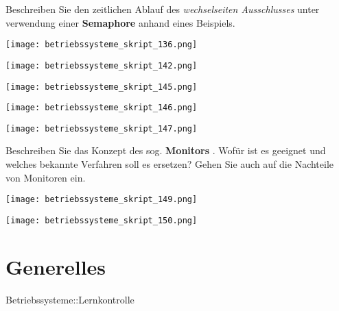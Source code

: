 \documentclass{article}
\begin{document}
\begin{tcolorbox}[colback=white!10!white,colframe=lightgray!75!black,
  savelowerto=\jobname_ex.tex,breakable,enhanced,lines before break=40]

\begin{center}
Beschreiben Sie den zeitlichen Ablauf des 
\textit{wechselseiten Ausschlusses
} unter verwendung einer 
\textbf{Semaphore
} anhand eines Beispiels.

\end{center}

\tcblower

\justifying
\begin{center}
\texttt{[image: betriebssysteme\_skript\_136.png]}
\end{center}
\begin{center}
\texttt{[image: betriebssysteme\_skript\_142.png]}
\end{center}
\begin{center}
\texttt{[image: betriebssysteme\_skript\_145.png]}
\end{center}
\begin{center}
\texttt{[image: betriebssysteme\_skript\_146.png]}
\end{center}
\begin{center}
\texttt{[image: betriebssysteme\_skript\_147.png]}
\end{center}

\end{tcolorbox}
\begin{tcolorbox}[colback=white!10!white,colframe=lightgray!75!black,
  savelowerto=\jobname_ex.tex,breakable,enhanced,lines before break=40]

\begin{center}
Beschreiben Sie das Konzept des sog. 
\textbf{Monitors
}. Wofür ist es geeignet und welches bekannte Verfahren soll es ersetzen?
Gehen Sie auch auf die Nachteile von Monitoren ein.

\end{center}

\tcblower

\justifying
\begin{center}
\texttt{[image: betriebssysteme\_skript\_149.png]}
\end{center}
\begin{center}
\texttt{[image: betriebssysteme\_skript\_150.png]}
\end{center}

\end{tcolorbox}
\section{Generelles}
\begin{tcolorbox}[colback=white!10!white,colframe=lightgray!75!black,
  savelowerto=\jobname_ex.tex,breakable,enhanced,lines before break=40]

\begin{center}
Betriebssysteme::Lernkontrolle

\end{center}

\tcblower

\justifying

\end{tcolorbox}
\end{document}
